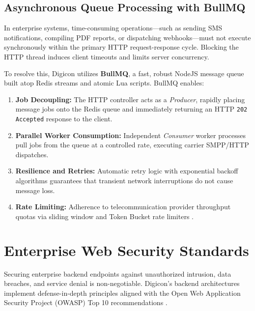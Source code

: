 \subsection{Asynchronous Queue Processing with BullMQ}
In enterprise systems, time-consuming operations—such as sending SMS notifications, compiling PDF reports, or dispatching webhooks—must not execute synchronously within the primary HTTP request-response cycle. Blocking the HTTP thread induces client timeouts and limits server concurrency.

To resolve this, Digicon utilizes \textbf{BullMQ}, a fast, robust NodeJS message queue built atop Redis streams and atomic Lua scripts. BullMQ enables:
\begin{enumerate}
    \item \textbf{Job Decoupling:} The HTTP controller acts as a \textit{Producer}, rapidly placing message jobs onto the Redis queue and immediately returning an HTTP \texttt{202 Accepted} response to the client.
    \item \textbf{Parallel Worker Consumption:} Independent \textit{Consumer} worker processes pull jobs from the queue at a controlled rate, executing carrier SMPP/HTTP dispatches.
    \item \textbf{Resilience and Retries:} Automatic retry logic with exponential backoff algorithms guarantees that transient network interruptions do not cause message loss.
    \item \textbf{Rate Limiting:} Adherence to telecommunication provider throughput quotas via sliding window and Token Bucket rate limiters \citep{turner1986new}.
\end{enumerate}

\section{Enterprise Web Security Standards}
\label{sec:tech_security}

Securing enterprise backend endpoints against unauthorized intrusion, data breaches, and service denial is non-negotiable. Digicon's backend architectures implement defense-in-depth principles aligned with the Open Web Application Security Project (OWASP) Top 10 recommendations \citep{owasp2023top10}.

